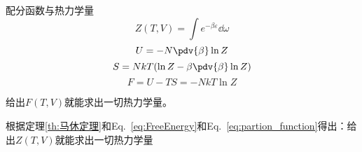 配分函数与热力学量
\begin{equation}
  Z(T,V) = \int e^{-\beta \varepsilon} \dd{\omega} 
  \label{eq:partion_function}
\end{equation}
\begin{equation*}
  U = - N \pdv{\beta} \ln Z
\end{equation*}
\begin{equation*}
  S  = N k T ( \ln Z - \beta \pdv{\beta} \ln Z )
\end{equation*}
\begin{equation}
  F = U -TS = - NkT \ln Z
  \label{eq:FreeEnergy}
\end{equation}
\begin{theorem}[马休定理]
  给出\(F(T,V)\)就能求出一切热力学量。
  \label{th:马休定理}
\end{theorem}
根据定理\ref{th:马休定理}和Eq.~\eqref{eq:FreeEnergy}和Eq.~\eqref{eq:partion_function}得出：给出\(Z(T,V)\)就能求出一切热力学量


